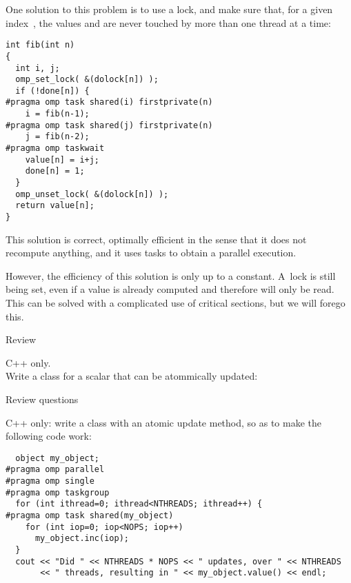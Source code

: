 One solution to this problem is to use a lock, and make sure that,
for a given index~, the values  and 
are never touched by more than one thread at a time:
\begin{lstlisting}
int fib(int n)
{
  int i, j;
  omp_set_lock( &(dolock[n]) );
  if (!done[n]) {
#pragma omp task shared(i) firstprivate(n)
    i = fib(n-1);
#pragma omp task shared(j) firstprivate(n)
    j = fib(n-2);
#pragma omp taskwait
    value[n] = i+j;
    done[n] = 1;
  }
  omp_unset_lock( &(dolock[n]) );
  return value[n];
}
\end{lstlisting}
This solution is correct, optimally efficient in the sense that it
does not recompute anything, and it uses tasks to obtain a parallel execution.

However, the efficiency of this solution is only up to a constant.
A~lock is still being set, even if a value is already computed and therefore
will only be read. This can be solved with a complicated use of critical sections,
but we will forego this.


 {Review}

\begin{exercise}
  C++ only.\\
  Write a class for a scalar that can be atommically updated:
\end{exercise}



 {Review questions}

\begin{exercise}
  C++ only: write a class with an atomic update method,
  so as to make the following code work:
\begin{lstlisting}
  object my_object;
#pragma omp parallel
#pragma omp single
#pragma omp taskgroup
  for (int ithread=0; ithread<NTHREADS; ithread++) {
#pragma omp task shared(my_object)
    for (int iop=0; iop<NOPS; iop++)
      my_object.inc(iop);
  }
  cout << "Did " << NTHREADS * NOPS << " updates, over " << NTHREADS
       << " threads, resulting in " << my_object.value() << endl;
\end{lstlisting}
\end{exercise}
